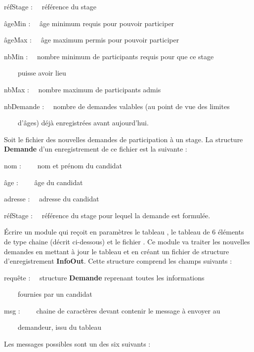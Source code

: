 {
réfStage  : \ \ référence du stage}

{
âgeMin : \ \ âge minimum requis pour pouvoir participer}

{
âgeMax : \ \ âge maximum permis pour pouvoir participer}

{
nbMin : \ \ nombre minimum de participants requis pour que ce stage }

{
\ \ \ \ puisse avoir lieu}

{
nbMax : \ \ nombre maximum de participants admis}

{
nbDemande : \ \ nombre de demandes valables (au point de vue des limites
}

{
\ \ \ \ d’âges) déjà enregistrées avant aujourd’hui.}


\bigskip

{
Soit le fichier  des nouvelles demandes de
participation à un stage. La structure \textbf{Demande} d’un
enregistrement de ce fichier est la suivante :}


\bigskip


\bigskip

{
nom : \ \ \ \ nom et prénom du candidat}

{
âge : \ \ \ \ âge du candidat}

{
adresse : \ \ adresse du candidat}

{
réfStage : \ \ référence du stage pour lequel la demande est formulée.}


\bigskip

{
Écrire un module qui reçoit en paramètres le tableau
, le tableau  de
6 éléments de type chaine (décrit ci-dessous) et le fichier
. Ce module va traiter les nouvelles
demandes en mettant à jour le tableau  et en
créant un fichier  de structure
d’enregistrement \textbf{InfoOut}. Cette structure comprend les champs
suivants :}


\bigskip

{
requête : \ \ structure \textbf{Demande}\textbf{\textit{ }}reprenant
toutes les informations }

{
\ \ \ \ fournies par un candidat}

{
msg : \ \ \ \ chaine de caractères devant contenir le message à envoyer
au}

{
\ \ \ \ demandeur, issu du tableau }

{
Les messages possibles sont un des six suivants : }

